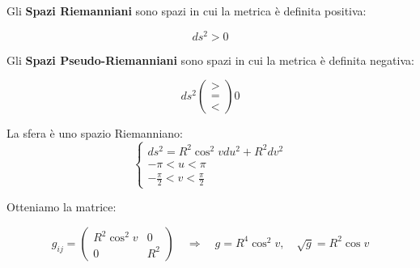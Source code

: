 Gli \textbf{Spazi Riemanniani} sono spazi in cui la metrica è definita positiva:

$$
ds^2 > 0
$$

Gli \textbf{Spazi Pseudo-Riemanniani} sono spazi in cui la metrica è definita negativa:

$$
ds^2 
\left (
\begin{array}{c}
    > \\
    = \\
    <
\end{array}
\right ) 0
$$

\begin{exampleblock}[Sfera]
    La sfera è uno spazio Riemanniano:
    $$
    \begin{cases}
    ds^2 = R^2 \cos^2 v du^2 + R^2 dv^2 \\
    - \pi < u < \pi \\
    - \frac{\pi}{2} < v < \frac{\pi}{2}
    \end{cases}
    $$

    Otteniamo la matrice:

    $$
    g_{ij} = \begin{pmatrix}
        R^2 \cos^2 v & 0 \\
        0 & R^2
    \end{pmatrix}
    \quad \Rightarrow \quad
    g = R^4 \cos^2 v, \quad \sqrt{g} = R^2 \cos v
    $$

\end{exampleblock}

